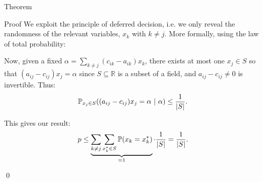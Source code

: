 \documentclass[a4paper]{article}
\begin{document}
\begin{parag}{Theorem}
\begin{subparag}{Proof}
        We exploit the principle of deferred decision, i.e. we only reveal the randomness of the relevant variables, $x_k$ with $k \neq j$. More formally, using the law of total probability:

        Now, given a fixed $\alpha = \sum_{k\neq j} \left(c_{ik} - a_{ik}\right) x_k$, there exists at most one $x_j \in S$ so that $\left(a_{ij} - c_{ij}\right) x_j = \alpha$ since $S \subseteq \mathbb{R}$ is a subset of a field, and $a_{ij} - c_{ij} \neq 0$ is invertible. Thus: 
        \[\prob_{x_j \in S}\left(\left(a_{ij} - c_{ij}\right)x_j = \alpha \suchthat \alpha\right) \leq \frac{1}{\left|S\right|}.\]

        This gives our result:
        \[p \leq \underbrace{\sum_{k \neq j}\sum_{x_k^* \in S} \prob\left(x_k = x_k^*\right)}_{= 1} \cdot \frac{1}{\left|S\right|} = \frac{1}{\left|S\right|}.\]

        \qed
    \end{subparag}
\end{parag}
\end{document}
